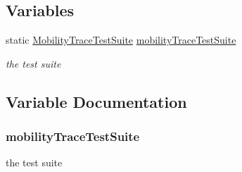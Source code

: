 \subsection*{Variables}
\begin{DoxyCompactItemize}
\item 
static \hyperlink{classMobilityTraceTestSuite}{Mobility\+Trace\+Test\+Suite} \hyperlink{mobility-trace-test-suite_8cc_a2dc638677cd4299ef081abd38f0f242a}{mobility\+Trace\+Test\+Suite}
\begin{DoxyCompactList}\small\item\em the test suite \end{DoxyCompactList}\end{DoxyCompactItemize}


\subsection{Variable Documentation}
\subsubsection[{\texorpdfstring{mobility\+Trace\+Test\+Suite}{mobilityTraceTestSuite}}]{ mobility\+Trace\+Test\+Suite\hspace{0.3cm}{\ttfamily [static]}}\hypertarget{mobility-trace-test-suite_8cc_a2dc638677cd4299ef081abd38f0f242a}{}\label{mobility-trace-test-suite_8cc_a2dc638677cd4299ef081abd38f0f242a}


the test suite 

